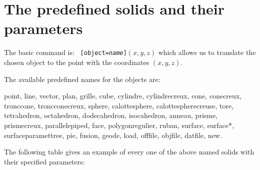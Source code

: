 \section {The predefined solids and their parameters}

The basic command is:~
\texttt{[object=\textsl{name}]$(x, y ,z)$} which allows us to translate the chosen object to the point with the coordinates $(x, y,
z)$.

The available predefined names for the objects are:
\begin{sloppypar}
{\ttfamily%
point, line, vector, plan, grille, cube, cylindre, cylindrecreux, cone, conecreux, tronccone,
troncconecreux, sphere, calottesphere, calottespherecreuse, tore,
tetrahedron, octahedron, dodecahedron,
isocahedron, anneau, prisme, prismecreux, parallelepiped, face, polygonregulier, ruban, surface, surface*, surfaceparamettree, pie, fusion, geode, load, offfile, objfile, datfile, new.}
\end{sloppypar}


The following table gives an example of every one of the above named solids with their specified parameters:

